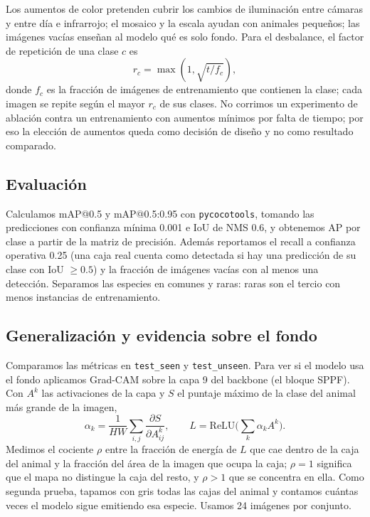 \documentclass[10pt,letterpaper]{article}
\begin{document}
Los aumentos de color pretenden cubrir los cambios de iluminación entre cámaras y entre día e infrarrojo; el mosaico y la escala ayudan con animales pequeños;
las imágenes vacías enseñan al modelo qué es solo fondo. Para el desbalance, el factor de repetición de una clase $c$ es
\begin{equation}
r_c = \max\!\left(1,\sqrt{t/f_c}\right),
\end{equation}
donde $f_c$ es la fracción de imágenes de entrenamiento que contienen la clase; cada imagen se repite según el mayor $r_c$ de sus clases.
No corrimos un experimento de ablación contra un entrenamiento con aumentos mínimos por falta de tiempo; por eso la elección de aumentos queda como decisión de
diseño y no como resultado comparado.

\subsection{Evaluación}
Calculamos mAP@0.5 y mAP@0.5:0.95 con \texttt{pycocotools}, tomando las predicciones con confianza mínima 0.001 e IoU de NMS 0.6, y obtenemos AP por clase a partir de la
matriz de precisión. Además reportamos el recall a confianza operativa 0.25 (una caja real cuenta como detectada si hay una predicción de su clase con IoU $\ge 0.5$) y la
fracción de imágenes vacías con al menos una detección. Separamos las especies en comunes y raras: raras son el tercio con menos instancias de entrenamiento.

\subsection{Generalización y evidencia sobre el fondo}
Comparamos las métricas en \texttt{test\_seen} y \texttt{test\_unseen}. Para ver si el modelo usa el fondo aplicamos Grad-CAM sobre la capa 9 del backbone (el bloque SPPF).
Con $A^k$ las activaciones de la capa y $S$ el puntaje máximo de la clase del animal más grande de la imagen,
\begin{equation}
\alpha_k=\frac{1}{HW}\sum_{i,j}\frac{\partial S}{\partial A^k_{ij}},\qquad
L=\mathrm{ReLU}\Big(\sum_k \alpha_k A^k\Big).
\end{equation}
Medimos el cociente $\rho$ entre la fracción de energía de $L$ que cae dentro de la caja del animal y la fracción del área de la imagen que ocupa la caja;
$\rho=1$ significa que el mapa no distingue la caja del resto, y $\rho>1$ que se concentra en ella. Como segunda prueba, tapamos con gris todas las cajas del animal y
contamos cuántas veces el modelo sigue emitiendo esa especie. Usamos 24 imágenes por conjunto.
\end{document}

